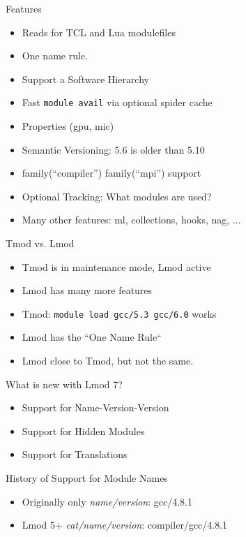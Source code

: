 \documentclass{beamer}
\begin{document}
\begin{frame}{Features}
  \begin{itemize}
    \item Reads for TCL and Lua modulefiles
    \item One name rule.
    \item Support a Software Hierarchy
    \item Fast \texttt{module avail} via optional spider cache 
    \item Properties (gpu, mic)
    \item Semantic Versioning:  5.6 is older than 5.10
    \item family(``compiler'') family(``mpi'') support
    \item Optional Tracking: What modules are used?
    \item Many other features: ml, collections, hooks, nag, ...
  \end{itemize}
\end{frame}

\begin{frame}{Tmod vs. Lmod}
  \begin{itemize}
    \item Tmod is in maintenance mode, Lmod active
    \item Lmod has many more features
    \item Tmod: \texttt{module load gcc/5.3 gcc/6.0} works
    \item Lmod has the ``One Name Rule``
    \item Lmod close to Tmod, but not the same.
  \end{itemize}
\end{frame}

\begin{frame}{What is new with Lmod 7?}
  \begin{itemize}
    \item Support for Name-Version-Version
    \item Support for Hidden Modules
    \item Support for Translations
  \end{itemize}
\end{frame}

\begin{frame}{History of Support for Module Names}
  \begin{itemize}
    \item Originally only \emph{name/version}:  gcc/4.8.1
    \item Lmod 5+ \emph{cat/name/version}:  compiler/gcc/4.8.1
  \end{itemize}
\end{frame}
\end{document}

